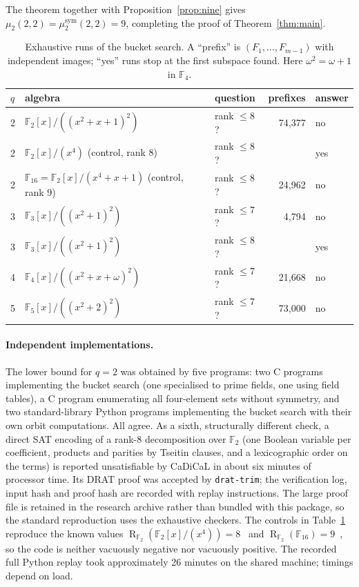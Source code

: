\documentclass[11pt]{amsart}
\theoremstyle{definition}
\theoremstyle{remark}
\newcommand{\F}{\mathbb F}
\newcommand{\R}{\operatorname{R}}
\begin{document}
The theorem together with Proposition~\ref{prop:nine} gives $\mu_2(2,2)=\mu_2^{\mathrm{sym}}(2,2)=9$, completing the proof of Theorem~\ref{thm:main}.

\begin{table}[ht]
\centering
\begin{tabular}{lllrl}
\toprule
$q$ & algebra & question & prefixes & answer\\
\midrule
2 & $\F_2[x]/((x^2+x+1)^2)$ & rank $\le8$? & 74{,}377 & no\\
2 & $\F_2[x]/(x^4)$ (control, rank 8) & rank $\le8$? & & yes\\
2 & $\F_{16}=\F_2[x]/(x^4+x+1)$ (control, rank 9) & rank $\le8$? & 24{,}962 & no\\
3 & $\F_3[x]/((x^2+1)^2)$ & rank $\le7$? & 4{,}794 & no\\
3 & $\F_3[x]/((x^2+1)^2)$ & rank $\le8$? & & yes\\
4 & $\F_4[x]/((x^2+x+\omega)^2)$ & rank $\le7$? & 21{,}668 & no\\
5 & $\F_5[x]/((x^2+2)^2)$ & rank $\le7$? & 73{,}000 & no\\
\bottomrule
\end{tabular}
\caption{Exhaustive runs of the bucket search. A ``prefix'' is $(F_1,\dots,F_{m-1})$ with independent images; ``yes'' runs stop at the first subspace found. Here $\omega^2=\omega+1$ in $\F_4$.}
\label{tab:runs}
\end{table}

\paragraph{Independent implementations.} The lower bound for $q=2$ was obtained by five programs: two C programs implementing the bucket search (one specialised to prime fields, one using field tables), a C program enumerating all four-element sets without symmetry, and two standard-library Python programs implementing the bucket search with their own orbit computations. All agree. As a sixth, structurally different check, a direct SAT encoding of a rank-$8$ decomposition over $\F_2$ (one Boolean variable per coefficient, products and parities by Tseitin clauses, and a lexicographic order on the terms) is reported unsatisfiable by CaDiCaL in about six minutes of processor time. Its DRAT proof was accepted by \texttt{drat-trim}; the verification log, input hash and proof hash are recorded with replay instructions. The large proof file is retained in the research archive rather than bundled with this package, so the standard reproduction uses the exhaustive checkers. The controls in Table~\ref{tab:runs} reproduce the known values $\R_{\F_2}(\F_2[x]/(x^4))=8$~\cite{Wang2026} and $\R_{\F_2}(\F_{16})=9$~\cite{BalletSurvey}, so the code is neither vacuously negative nor vacuously positive. The recorded full Python replay took approximately 26 minutes on the shared machine; timings depend on load.
\end{document}
